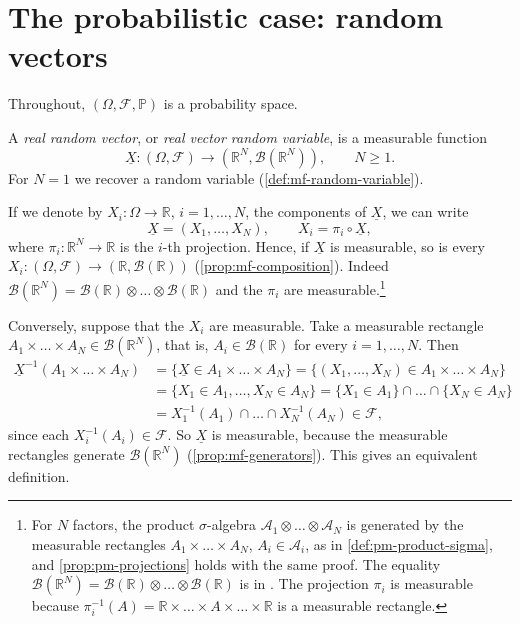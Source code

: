 \section{The probabilistic case: random vectors}\label{sec:pm-random-vectors}

Throughout, $(\Omega,\mathcal F,\mathbb P)$ is a probability space.

\begin{definition}\label{def:pm-random-vector}
A \emph{real random vector}, or \emph{real vector random variable}, is a measurable function
\[
  \underline X:(\Omega,\mathcal F)\to(\mathbb R^N,\mathcal B(\mathbb R^N)),\qquad N\ge1 .
\]
For $N=1$ we recover a random variable (\cref{def:mf-random-variable}).
\end{definition}

If we denote by $X_i:\Omega\to\mathbb R$, $i=1,\dots,N$, the components of $\underline X$, we
can write
\[
  \underline X=(X_1,\dots,X_N),\qquad X_i=\pi_i\circ\underline X,
\]
where $\pi_i:\mathbb R^N\to\mathbb R$ is the $i$-th projection. Hence, if $\underline X$ is
measurable, so is every $X_i:(\Omega,\mathcal F)\to(\mathbb R,\mathcal B(\mathbb R))$
(\cref{prop:mf-composition}). Indeed
$\mathcal B(\mathbb R^N)=\mathcal B(\mathbb R)\otimes\dots\otimes\mathcal B(\mathbb R)$ and the
$\pi_i$ are measurable.\footnote{For $N$ factors, the product $\sigma$-algebra
$\mathcal A_1\otimes\dots\otimes\mathcal A_N$ is generated by the measurable rectangles
$A_1\times\dots\times A_N$, $A_i\in\mathcal A_i$, as in \cref{def:pm-product-sigma}, and
\cref{prop:pm-projections} holds with the same proof. The equality
$\mathcal B(\mathbb R^N)=\mathcal B(\mathbb R)\otimes\dots\otimes\mathcal B(\mathbb R)$ is in
\citet[Section~1.2]{folland}. The projection $\pi_i$ is measurable because
$\pi_i^{-1}(A)=\mathbb R\times\dots\times A\times\dots\times\mathbb R$ is a measurable
rectangle.}

Conversely, suppose that the $X_i$ are measurable. Take a measurable rectangle
$A_1\times\dots\times A_N\in\mathcal B(\mathbb R^N)$, that is, $A_i\in\mathcal B(\mathbb R)$ for
every $i=1,\dots,N$. Then
\[
\begin{aligned}
  \underline X^{-1}(A_1\times\dots\times A_N)
  &=\{\underline X\in A_1\times\dots\times A_N\}=\{(X_1,\dots,X_N)\in A_1\times\dots\times A_N\}\\
  &=\{X_1\in A_1,\dots,X_N\in A_N\}=\{X_1\in A_1\}\cap\dots\cap\{X_N\in A_N\}\\
  &=X_1^{-1}(A_1)\cap\dots\cap X_N^{-1}(A_N)\in\mathcal F,
\end{aligned}
\]
since each $X_i^{-1}(A_i)\in\mathcal F$. So $\underline X$ is measurable, because the
measurable rectangles generate $\mathcal B(\mathbb R^N)$ (\cref{prop:mf-generators}). This
gives an equivalent definition.

